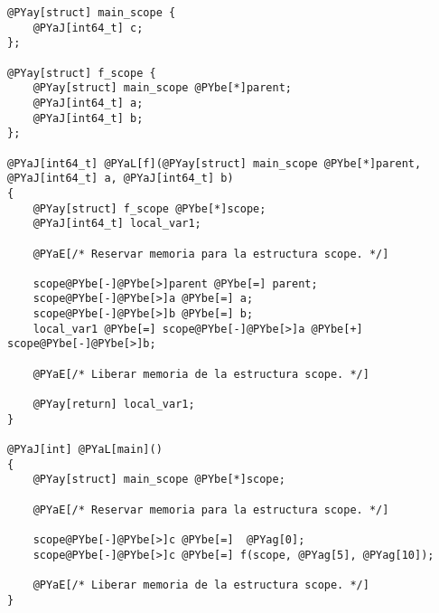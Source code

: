 \begin{Verbatim}[commandchars=@\[\]]
@PYay[struct] main_scope {
    @PYaJ[int64_t] c;
};

@PYay[struct] f_scope {
    @PYay[struct] main_scope @PYbe[*]parent;
    @PYaJ[int64_t] a;
    @PYaJ[int64_t] b;
};

@PYaJ[int64_t] @PYaL[f](@PYay[struct] main_scope @PYbe[*]parent, @PYaJ[int64_t] a, @PYaJ[int64_t] b)
{
    @PYay[struct] f_scope @PYbe[*]scope;
    @PYaJ[int64_t] local_var1;

    @PYaE[/* Reservar memoria para la estructura scope. */]

    scope@PYbe[-]@PYbe[>]parent @PYbe[=] parent;
    scope@PYbe[-]@PYbe[>]a @PYbe[=] a;
    scope@PYbe[-]@PYbe[>]b @PYbe[=] b;
    local_var1 @PYbe[=] scope@PYbe[-]@PYbe[>]a @PYbe[+] scope@PYbe[-]@PYbe[>]b;

    @PYaE[/* Liberar memoria de la estructura scope. */]

    @PYay[return] local_var1;
}

@PYaJ[int] @PYaL[main]()
{
    @PYay[struct] main_scope @PYbe[*]scope;

    @PYaE[/* Reservar memoria para la estructura scope. */]

    scope@PYbe[-]@PYbe[>]c @PYbe[=]  @PYag[0];
    scope@PYbe[-]@PYbe[>]c @PYbe[=] f(scope, @PYag[5], @PYag[10]);

    @PYaE[/* Liberar memoria de la estructura scope. */]
}
\end{Verbatim}

